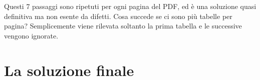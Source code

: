 Questi 7 passaggi sono ripetuti per ogni pagina del PDF, ed è una soluzione quasi definitiva ma non esente da difetti. Cosa succede se ci sono più tabelle per pagina? Semplicemente viene rilevata soltanto la prima tabella e le successive vengono ignorate.
\section{La soluzione finale}









